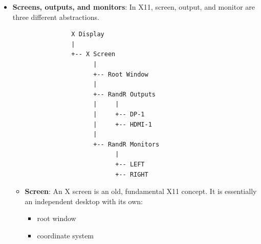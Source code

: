 \documentclass{report}
\begin{document}
\begin{itemize}
\begin{itemize}
                \item \textbf{RROutput *outputs:} Array of outputs tied to the monitor.
            \end{itemize}
            The key thing to understand is that XRRMonitorInfo describes a logical monitor rectangle, not necessarily one physical connector. A monitor can be backed by one or more RandR outputs.
            \bigbreak \noindent 
            \texttt{name} is an \textbf{Atom}. To get a string that represents the name, use \textbf{XGetAtomName}
            \bigbreak \noindent 
            \begin{cppcode}
            char *name = XGetAtomName(display, monitor.name);
            XFree(name);
            \end{cppcode}
            \bigbreak \noindent 
            The important distinction is that this is the name of the RandR monitor object, not necessarily the name of the underlying physical output.
            \bigbreak \noindent 
            An output is a display pipeline/connector such as HDMI-1 or DP-1, while a monitor is a logical region of the X screen that applications and window managers can treat as one monitor.
            \bigbreak \noindent 
            \texttt{Automatic} indicates that RandR considers this monitor automatically generated/configured, rather than an explicitly defined logical monitor.
        \item \textbf{Screens, outputs, and monitors}: In X11, screen, output, and monitor are three different abstractions.
            \begin{verbatim}
                X Display
                |
                +-- X Screen
                      |
                      +-- Root Window
                      |
                      +-- RandR Outputs
                      |     |
                      |     +-- DP-1
                      |     +-- HDMI-1
                      |
                      +-- RandR Monitors
                            |
                            +-- LEFT
                            +-- RIGHT
            \end{verbatim}
            \begin{itemize}
                \item \textbf{Screen}: An X screen is an old, fundamental X11 concept. It is essentially an independent desktop with its own:
                    \begin{itemize}
                        \item root window
                        \item coordinate system

\end{itemize}
\end{itemize}
\end{itemize}
\end{document}
